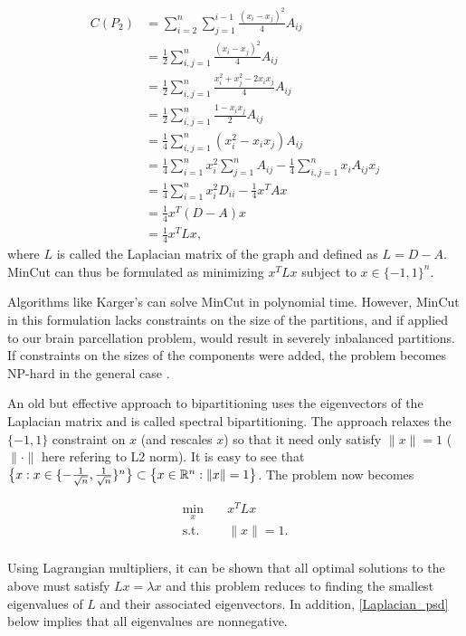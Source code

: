 \begin{align*}
C(P_2)
&= \sum_{i = 2}^n \sum_{j = 1}^{i-1} \frac{(x_i - x_j)^2}{4} A_{ij} \\
&= \frac{1}{2} \sum_{i,j = 1}^n \frac{(x_i - x_j)^2}{4} A_{ij} \\
&= \frac{1}{2} \sum_{i,j = 1}^n
   \frac{x_i^2 + x_j^2 - 2 x_i x_j}{4} A_{ij} \\
&= \frac{1}{2} \sum_{i,j = 1}^n \frac{1 - x_i x_j}{2} A_{ij} \\
&= \frac{1}{4} \sum_{i,j = 1}^n (x_i^2 - x_i x_j) A_{ij} \\
&= \frac{1}{4} \sum_{i = 1}^n x_i^2 \sum_{j = 1}^n A_{ij}
 - \frac{1}{4} \sum_{i,j = 1}^n x_i A_{ij} x_j \\
&= \frac{1}{4} \sum_{i = 1}^n x_i^2 D_{ii} - \frac{1}{4} x^T A x \\
&= \frac{1}{4} x^T (D - A) x \\
&= \frac{1}{4} x^T L x,
\end{align*}
where $L$ is called the Laplacian matrix of the graph and defined as
$L = D - A$. MinCut can thus be formulated as minimizing $x^T L x$
subject to $x \in \{-1, 1\}^n$.

Algorithms like Karger's can solve MinCut in polynomial time. However,
MinCut in this formulation lacks constraints on the size of the
partitions, and if applied to our brain parcellation problem, would
result in severely inbalanced partitions. If constraints on the sizes
of the components were added, the problem becomes NP-hard in the
general case \cite{Buluc:13}.

An old but effective approach to bipartitioning uses the eigenvectors
of the Laplacian matrix and is called spectral bipartitioning.
The approach relaxes the $\{-1, 1\}$ constraint on $x$ (and rescales
$x$) so that it need only satisfy $\|x\| = 1$ ($\|\cdot\|$ here refering
to L2 norm). It is easy to see that
$\big\{ x : x \in \{-\frac{1}{\sqrt{n}}, \frac{1}{\sqrt{n}}\}^n \big\}
 \subset \big\{ x \in \mathbb{R}^n : \|x\| = 1 \big\}$.
The problem now becomes

\begin{equation} \label{spectral_bipartition}
\begin{aligned}
\min_x      &\;& x^T L x \\
\text{s.t.} &\;& \| x \| = 1. \\
\end{aligned}
\end{equation}

Using Lagrangian multipliers, it can be shown that all optimal solutions
to the above must satisfy $L x = \lambda x$ and this problem reduces to
finding the smallest eigenvalues of $L$ and their associated
eigenvectors. In addition, \ref{Laplacian_psd} below implies that all
eigenvalues are nonnegative.

